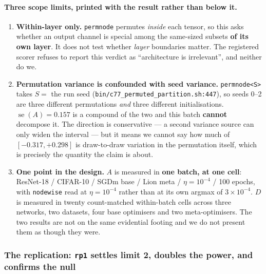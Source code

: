 \documentclass[10pt,letterpaper]{article}
\newcommand{\Dstat}{D}                         %
\newcommand{\Astat}{A}                         %
\newcommand{\arm}[1]{\texttt{#1}}
\DeclareMathOperator{\se}{se}
\begin{document}
\paragraph{Three scope limits, printed with the result rather than below it.}
\begin{enumerate}
\item \textbf{Within-layer only.} \arm{permnode} permutes \emph{inside} each tensor, so this asks
  whether an output channel is special among the same-sized subsets \textbf{of its own layer}. It
  does not test whether \emph{layer} boundaries matter. The registered scorer refuses to report
  this verdict as ``architecture is irrelevant'', and neither do we.
\item \textbf{Permutation variance is confounded with seed variance.} \arm{permnode<S>} takes
  $S =$ the run seed (\texttt{bin/c77\_permuted\_partition.sh:447}), so seeds 0--2 are three
  different permutations \emph{and} three different initialisations.
  $\se(\Astat) = 0.157$ is a compound of the two and this batch \textbf{cannot} decompose it. The
  direction is conservative --- a second variance source can only widen the interval --- but it
  means we cannot say how much of $[-0.317, +0.298]$ is draw-to-draw variation in the permutation
  itself, which is precisely the quantity the claim is about.
\item \textbf{One point in the design.} $\Astat$ is measured in \textbf{one batch, at one cell}:
  ResNet-18 / CIFAR-10 / SGDm base / Lion meta / $\eta = 10^{-4}$ / 100 epochs, with
  \arm{nodewise} read at $\eta = 10^{-4}$ rather than at its own argmax of $3\times10^{-4}$.
  $\Dstat$ is measured in twenty count-matched within-batch cells across three networks, two
  datasets, four base optimisers and two meta-optimisers. The two results are not on the same
  evidential footing and
  we do not present them as though they were.
\end{enumerate}

\subsubsection{The replication: \arm{rp1} settles limit 2, doubles the power, and confirms the
null}
\label{sec:rp1}
\end{document}
